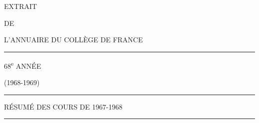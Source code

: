 \begin{center}
EXTRAIT

DE

L'ANNUAIRE DU COLLÈGE DE FRANCE

\rule{1.1cm}{.4pt}

68\textsuperscript{e} ANNÉE

(1968-1969)

\rule{1.1cm}{.4pt}

RÉSUMÉ DES COURS DE 1967-1968

\rule{1.6cm}{.4pt}
\end{center}
